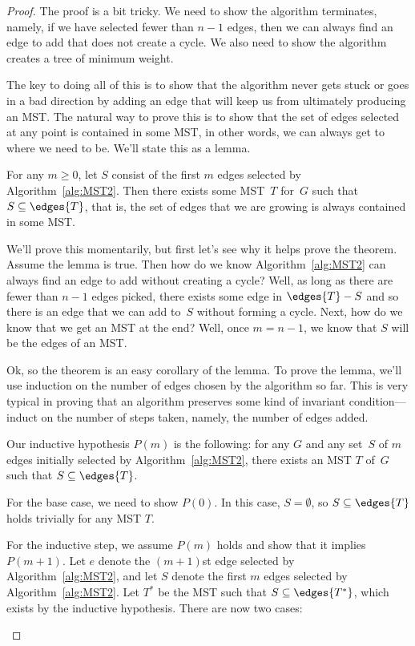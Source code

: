 \begin{proof}
The proof is a bit tricky.  We need to show the algorithm terminates,
namely, if we have selected fewer than $n - 1$ edges, then we can
always find an edge to add that does not create a cycle.  We also need
to show the algorithm creates a tree of minimum weight.

The key to doing all of this is to show that the algorithm never gets
stuck or goes in a bad direction by adding an edge that will keep us
from ultimately producing an MST\@.  The natural way to prove this is
to show that the set of edges selected at any point is contained in
some MST, in other words, we can always get to where we need to be.
We'll state this as a lemma.

\begin{lemma}\label{lemma:MST2}
  For any $m \ge 0$, let $S$ consist of the first $m$ edges selected by
  Algorithm~\ref{alg:MST2}.  Then there exists some MST~$T$ for~$G$ such
  that $S \subseteq \edges{T}$, that is, the set of edges that we are
  growing is always contained in some MST\@.
\end{lemma}

We'll prove this momentarily, but first let's see why it helps prove
the theorem.  Assume the lemma is true.  Then how do we know
Algorithm~\ref{alg:MST2} can always find an edge to add without
creating a cycle?  Well, as long as there are fewer than $n - 1$ edges
picked, there exists some edge in $\edges{T} - S$ and so there is an
edge that we can add to~$S$ without forming a cycle.  Next, how do we
know that we get an MST at the end?  Well, once $m = n - 1$, we know
that $S$ will be the edges of an MST.

Ok, so the theorem is an easy corollary of the lemma.  To prove the
lemma, we'll use induction on the number of edges chosen by the
algorithm so far.  This is very typical in proving that an algorithm
preserves some kind of invariant condition---induct on the number of
steps taken, namely, the number of edges added.

Our inductive hypothesis $P(m)$ is the following: for any $G$ and any
set~$S$ of $m$ edges initially selected by Algorithm~\ref{alg:MST2},
there exists an MST $T$ of~$G$ such that $S \subseteq \edges{T}$.

For the base case, we need to show $P(0)$.  In this case, $S =
\emptyset$, so $S \subseteq \edges{T}$ holds trivially for any MST
$T$.

For the inductive step, we assume $P(m)$ holds and show that it
implies $P(m + 1)$.  Let $e$ denote the $(m+1)$st edge selected by
Algorithm~\ref{alg:MST2}, and let $S$ denote the first $m$ edges
selected by Algorithm~\ref{alg:MST2}.  Let $T^*$ be the
MST such that $S \subseteq \edges{T^*}$, which exists by the inductive
hypothesis.  There are now two cases:
\begin{description}


\end{description}
\end{proof}
